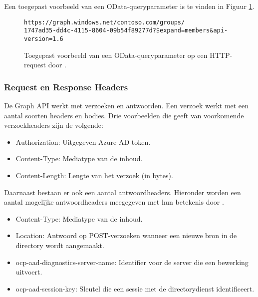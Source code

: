 Een toegepast voorbeeld van een OData-queryparameter is te vinden in Figuur \ref{odqp}. \\

\begin{figure}[h]
\scriptsize\begin{verbatim}
https://graph.windows.net/contoso.com/groups/
1747ad35-dd4c-4115-8604-09b54f89277d?$expand=members&api-version=1.6
\end{verbatim}    
\caption[Voorbeeld OData-queryparamter]{Toegepast voorbeeld van een OData-queryparameter op een \ac{HTTP}-request door \textcite{Microsoft2016b}.}
\label{odqp}
\end{figure}

\subsubsection{Request en Response Headers}


De Graph \ac{API} werkt met verzoeken en antwoorden. Een verzoek werkt met een aantal soorten headers en bodies. Drie voorbeelden die \textcite{Microsoft2015} geeft van voorkomende verzoekheaders zijn de volgende:

\begin{itemize}
    \item Authorization: Uitgegeven Azure \ac{AD}-token.
    \item Content-Type: Mediatype van de inhoud.
    \item Content-Length: Lengte van het verzoek (in bytes).
\end{itemize} 

Daarnaast bestaan er ook een aantal antwoordheaders. Hieronder worden een aantal mogelijke antwoordheaders meegegeven met hun betekenis door \textcite{Microsoft2015}.

\begin{itemize}
    \item Content-Type: Mediatype van de inhoud.
    \item Location: Antwoord op POST-verzoeken wanneer een nieuwe bron in de directory wordt aangemaakt.
    \item ocp-aad-diagnostics-server-name: Identifier voor de server die een bewerking uitvoert.
    \item ocp-aad-session-key: Sleutel die een sessie met de directorydienst identificeert.
\end{itemize}

